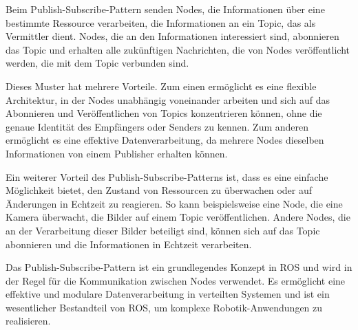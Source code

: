     Beim Publish-Subscribe-Pattern senden Nodes, die Informationen über eine bestimmte Ressource verarbeiten, die Informationen an ein Topic, das als Vermittler dient. Nodes, die an den Informationen interessiert sind, abonnieren das Topic und erhalten alle zukünftigen Nachrichten, die von Nodes veröffentlicht werden, die mit dem Topic verbunden sind.

    Dieses Muster hat mehrere Vorteile. Zum einen ermöglicht es eine flexible Architektur, in der Nodes unabhängig voneinander arbeiten und sich auf das Abonnieren und Veröffentlichen von Topics konzentrieren können, ohne die genaue Identität des Empfängers oder Senders zu kennen. Zum anderen ermöglicht es eine effektive Datenverarbeitung, da mehrere Nodes dieselben Informationen von einem Publisher erhalten können.

    Ein weiterer Vorteil des Publish-Subscribe-Patterns ist, dass es eine einfache Möglichkeit bietet, den Zustand von Ressourcen zu überwachen oder auf Änderungen in Echtzeit zu reagieren. So kann beispielsweise eine Node, die eine Kamera überwacht, die Bilder auf einem Topic veröffentlichen. Andere Nodes, die an der Verarbeitung dieser Bilder beteiligt sind, können sich auf das Topic abonnieren und die Informationen in Echtzeit verarbeiten.

    Das Publish-Subscribe-Pattern ist ein grundlegendes Konzept in \ac{ROS} und wird in der Regel für die Kommunikation zwischen Nodes verwendet. Es ermöglicht eine effektive und modulare Datenverarbeitung in verteilten Systemen und ist ein wesentlicher Bestandteil von \ac{ROS}, um komplexe Robotik-Anwendungen zu realisieren.
    
    \cite[vgl.][]{ROSconcepts}


